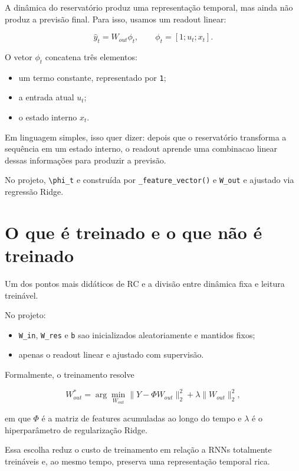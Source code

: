 \documentclass[12pt]{article}
\providecommand{\tightlist}{%
              \setlength{\itemsep}{0pt}\setlength{\parskip}{0pt}}
\begin{document}
A dinâmica do reservatório produz uma representação temporal, mas ainda não produz a previsão final. Para isso, usamos um readout linear:

\[
\hat{y}_t = W_{out} \phi_t,
\qquad
\phi_t = [1; u_t; x_t].
\]

O vetor \(\phi_t\) concatena três elementos:

\begin{itemize}
\tightlist
\item
  um termo constante, representado por \texttt{1};
\item
  a entrada atual \(u_t\);
\item
  o estado interno \(x_t\).
\end{itemize}

Em linguagem simples, isso quer dizer: depois que o reservatório transforma a sequência em um estado interno, o readout aprende uma combinacao linear dessas informações para produzir a previsão.

No projeto, \texttt{\textbackslash{}phi\_t} e construída por \texttt{\_feature\_vector()} e \texttt{W\_out} e ajustado via regressão Ridge.

\section{O que é treinado e o que não é treinado}\label{4-o-que-uxe9-treinado-e-o-que-nuxe3o-uxe9-treinado}

Um dos pontos mais didáticos de RC e a divisão entre dinâmica fixa e leitura treinável.

No projeto:

\begin{itemize}
\tightlist
\item
  \texttt{W\_in}, \texttt{W\_res} e \texttt{b} sao inicializados aleatoriamente e mantidos fixos;
\item
  apenas o readout linear e ajustado com supervisão.
\end{itemize}

Formalmente, o treinamento resolve

\[
W_{out}^* = \arg\min_{W_{out}}
\|Y - \Phi W_{out}\|_2^2 + \lambda \|W_{out}\|_2^2,
\]

em que \(\Phi\) é a matriz de features acumuladas ao longo do tempo e \(\lambda\) é o hiperparâmetro de regularização Ridge.

Essa escolha reduz o custo de treinamento em relação a RNNs totalmente treináveis e, ao mesmo tempo, preserva uma representação temporal rica.
\end{document}
